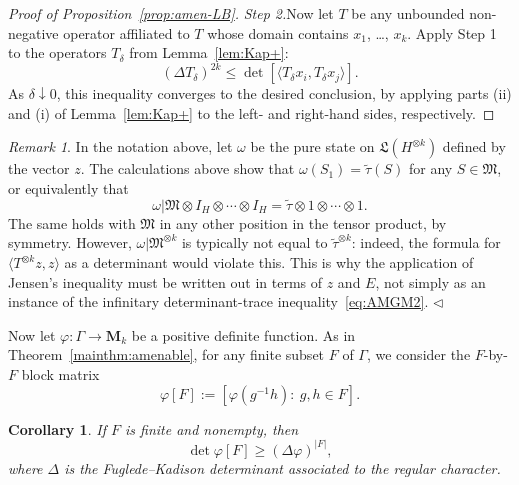 \documentclass[12pt,a4paper]{article}
\numberwithin{equation}{section}
\newtheorem{cor}[thm]{Corollary}
\theoremstyle{remark}
\newtheorem{rmk}[thm]{Remark}
\newcommand{\rmM}{\mathbf{M}}
\newcommand{\frL}{\mathfrak{L}}
\newcommand{\M}{\mathfrak{M}}
\newcommand{\G}{\Gamma}
\renewcommand{\phi}{\varphi}
\renewcommand{\t}[1]{\widetilde{#1}}
\newcommand{\fin}{\nolinebreak\hspace{\stretch{1}}$\lhd$}
\begin{document}
\begin{proof}[Proof of Proposition~\ref{prop:amen-LB}]
\vspace{7pt}

\emph{Step 2.}\quad Now let $T$ be any unbounded non-negative operator affiliated to $T$ whose domain contains $x_1$, \dots, $x_k$.  Apply Step 1 to the operators $T_\delta$ from Lemma~\ref{lem:Kap+}:
\[(\Delta T_\delta)^{2k} \le \det [\langle T_\delta x_i,T_\delta x_j\rangle].\]
As $\delta \downarrow 0$, this inequality converges to the desired conclusion, by applying parts (ii) and (i) of Lemma~\ref{lem:Kap+} to the left- and right-hand sides, respectively.
\end{proof}

\begin{rmk}
In the notation above, let $\omega$ be the pure state on $\frL(H^{\otimes k})$ defined by the vector $z$. The calculations above show that $\omega(S_1) = \t{\tau}(S)$ for any $S \in \M$, or equivalently that
\[\omega|\M\otimes I_H\otimes \cdots \otimes I_H = \t{\tau}\otimes 1\otimes \cdots \otimes 1.\]
The same holds with $\M$ in any other position in the tensor product, by symmetry.  However, $\omega|\M^{\otimes k}$ is typically not equal to $\t{\tau}^{\otimes k}$: indeed, the formula for $\langle T^{\otimes k}z,z\rangle$ as a determinant would violate this.  This is why the application of Jensen's inequality must be written out in terms of $z$ and $E$, not simply as an instance of the infinitary determinant-trace inequality~\eqref{eq:AMGM2}. \fin
\end{rmk}

Now let $\phi:\G\to\rmM_k$ be a positive definite function.  As in Theorem~\ref{mainthm:amenable}, for any finite subset $F$ of $\G$, we consider the $F$-by-$F$ block matrix
\[\phi[F] := [\phi(g^{-1}h):\ g,h \in F].\]

\begin{cor}\label{cor:amen-LB}
If $F$ is finite and nonempty, then
\[\det \phi[F] \ge (\Delta \phi)^{|F|},\]
where $\Delta$ is the Fuglede--Kadison determinant associated to the regular character.
\end{cor}
\end{document}
